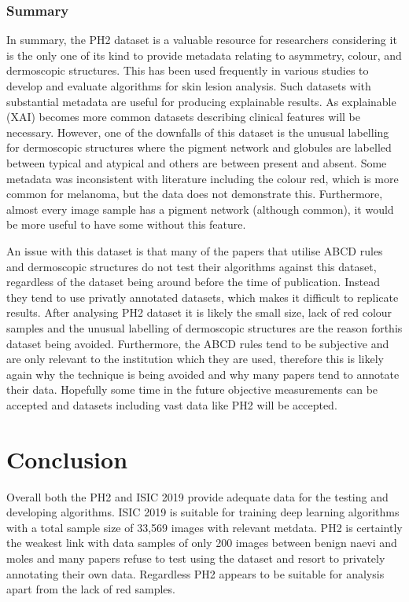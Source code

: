 
\subsubsection{Summary}
In summary, the PH2 dataset is a valuable resource for researchers considering it is the only one of its kind to provide metadata relating to asymmetry, colour, and dermoscopic structures. This has been used frequently in various studies to develop and evaluate algorithms for skin lesion analysis. Such datasets with substantial metadata are useful for producing explainable results. As explainable (XAI) becomes more common datasets describing clinical features will be necessary. However, one of the downfalls of this dataset is the unusual labelling for dermoscopic structures where the pigment network and globules are labelled between typical and atypical and others are between present and absent. Some metadata was inconsistent with literature including the colour red, which is more common for melanoma, but the data does not demonstrate this. Furthermore, almost every image sample has a pigment network (although common), it would be more useful to have some without this feature.

An issue with this dataset is that many of the papers that utilise ABCD rules and dermoscopic structures do not test their algorithms against this dataset, regardless of the dataset being around before the time of publication\cite{Kasmi2016, She2007, Tenenhaus2010, Ramezani2014, Zaqout2016}. Instead they tend to use privatly annotated datasets, which makes it difficult to replicate results. After analysing PH2 dataset it is likely the small size, lack of red colour samples and the unusual labelling of dermoscopic structures are the reason forthis dataset being avoided. Furthermore, the ABCD rules tend to be subjective and are only relevant to the institution which they are used, therefore this is likely again why the technique is being avoided and why many papers tend to annotate their data. Hopefully some time in the future objective measurements can be accepted and datasets including vast data like PH2 will be accepted.

\section{Conclusion}
Overall both the PH2 and ISIC 2019 provide adequate data for the testing and developing algorithms. ISIC 2019 is suitable for training deep learning algorithms with a total sample size of 33,569 images with relevant metdata. PH2 is certaintly the weakest link with data samples of only 200 images between benign naevi and moles and many papers refuse to test using the dataset and resort to privately annotating their
own data. Regardless PH2 appears to be suitable for analysis apart from the lack of red samples.

